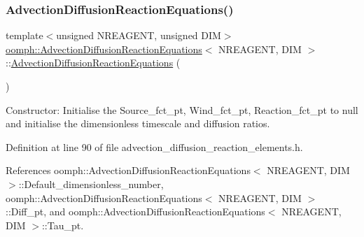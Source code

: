 \subsubsection{\texorpdfstring{Advection\+Diffusion\+Reaction\+Equations()}{AdvectionDiffusionReactionEquations()}\hspace{0.1cm}{\footnotesize\ttfamily [1/2]}}
{\footnotesize\ttfamily template$<$unsigned N\+R\+E\+A\+G\+E\+NT, unsigned D\+IM$>$ \\
\hyperlink{classoomph_1_1AdvectionDiffusionReactionEquations}{oomph\+::\+Advection\+Diffusion\+Reaction\+Equations}$<$ N\+R\+E\+A\+G\+E\+NT, D\+IM $>$\+::\hyperlink{classoomph_1_1AdvectionDiffusionReactionEquations}{Advection\+Diffusion\+Reaction\+Equations} (\begin{DoxyParamCaption}{ }\end{DoxyParamCaption})\hspace{0.3cm}{\ttfamily [inline]}}



Constructor\+: Initialise the Source\+\_\+fct\+\_\+pt, Wind\+\_\+fct\+\_\+pt, Reaction\+\_\+fct\+\_\+pt to null and initialise the dimensionless timescale and diffusion ratios. 



Definition at line 90 of file advection\+\_\+diffusion\+\_\+reaction\+\_\+elements.\+h.



References oomph\+::\+Advection\+Diffusion\+Reaction\+Equations$<$ N\+R\+E\+A\+G\+E\+N\+T, D\+I\+M $>$\+::\+Default\+\_\+dimensionless\+\_\+number, oomph\+::\+Advection\+Diffusion\+Reaction\+Equations$<$ N\+R\+E\+A\+G\+E\+N\+T, D\+I\+M $>$\+::\+Diff\+\_\+pt, and oomph\+::\+Advection\+Diffusion\+Reaction\+Equations$<$ N\+R\+E\+A\+G\+E\+N\+T, D\+I\+M $>$\+::\+Tau\+\_\+pt.

\mbox{\label{classoomph_1_1AdvectionDiffusionReactionEquations_a887f0a40932b1ca0aeb97cba56446a84}} 
